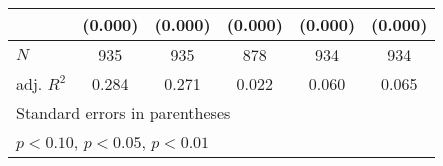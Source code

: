 {\begin{tabular}{l*{5}{c}}
            &     (0.000)         &     (0.000)         &     (0.000)         &     (0.000)         &     (0.000)         \\
\hline
\(N\)       &         935         &         935         &         878         &         934         &         934         \\
adj. \(R^{2}\)&       0.284         &       0.271         &       0.022         &       0.060         &       0.065         \\
\hline\hline
\multicolumn{6}{l}{\footnotesize Standard errors in parentheses}\\
\multicolumn{6}{l}{\footnotesize \sym{*} \(p<0.10\), \sym{**} \(p<0.05\), \sym{***} \(p<0.01\)}\\
\end{tabular}
}
